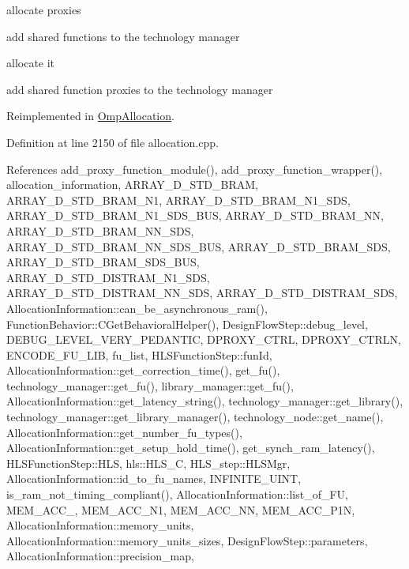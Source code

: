 allocate proxies

add shared functions to the technology manager

allocate it

add shared function proxies to the technology manager 

Reimplemented in \hyperlink{classOmpAllocation_a7be1bcabcbba606451d0abe4e70970f2}{Omp\+Allocation}.



Definition at line 2150 of file allocation.\+cpp.



References add\+\_\+proxy\+\_\+function\+\_\+module(), add\+\_\+proxy\+\_\+function\+\_\+wrapper(), allocation\+\_\+information, A\+R\+R\+A\+Y\+\_\+D\+\_\+\+S\+T\+D\+\_\+\+B\+R\+AM, A\+R\+R\+A\+Y\+\_\+D\+\_\+\+S\+T\+D\+\_\+\+B\+R\+A\+M\+\_\+\+N1, A\+R\+R\+A\+Y\+\_\+D\+\_\+\+S\+T\+D\+\_\+\+B\+R\+A\+M\+\_\+\+N1\+\_\+\+S\+DS, A\+R\+R\+A\+Y\+\_\+D\+\_\+\+S\+T\+D\+\_\+\+B\+R\+A\+M\+\_\+\+N1\+\_\+\+S\+D\+S\+\_\+\+B\+US, A\+R\+R\+A\+Y\+\_\+D\+\_\+\+S\+T\+D\+\_\+\+B\+R\+A\+M\+\_\+\+NN, A\+R\+R\+A\+Y\+\_\+D\+\_\+\+S\+T\+D\+\_\+\+B\+R\+A\+M\+\_\+\+N\+N\+\_\+\+S\+DS, A\+R\+R\+A\+Y\+\_\+D\+\_\+\+S\+T\+D\+\_\+\+B\+R\+A\+M\+\_\+\+N\+N\+\_\+\+S\+D\+S\+\_\+\+B\+US, A\+R\+R\+A\+Y\+\_\+D\+\_\+\+S\+T\+D\+\_\+\+B\+R\+A\+M\+\_\+\+S\+DS, A\+R\+R\+A\+Y\+\_\+D\+\_\+\+S\+T\+D\+\_\+\+B\+R\+A\+M\+\_\+\+S\+D\+S\+\_\+\+B\+US, A\+R\+R\+A\+Y\+\_\+D\+\_\+\+S\+T\+D\+\_\+\+D\+I\+S\+T\+R\+A\+M\+\_\+\+N1\+\_\+\+S\+DS, A\+R\+R\+A\+Y\+\_\+D\+\_\+\+S\+T\+D\+\_\+\+D\+I\+S\+T\+R\+A\+M\+\_\+\+N\+N\+\_\+\+S\+DS, A\+R\+R\+A\+Y\+\_\+D\+\_\+\+S\+T\+D\+\_\+\+D\+I\+S\+T\+R\+A\+M\+\_\+\+S\+DS, Allocation\+Information\+::can\+\_\+be\+\_\+asynchronous\+\_\+ram(), Function\+Behavior\+::\+C\+Get\+Behavioral\+Helper(), Design\+Flow\+Step\+::debug\+\_\+level, D\+E\+B\+U\+G\+\_\+\+L\+E\+V\+E\+L\+\_\+\+V\+E\+R\+Y\+\_\+\+P\+E\+D\+A\+N\+T\+IC, D\+P\+R\+O\+X\+Y\+\_\+\+C\+T\+RL, D\+P\+R\+O\+X\+Y\+\_\+\+C\+T\+R\+LN, E\+N\+C\+O\+D\+E\+\_\+\+F\+U\+\_\+\+L\+IB, fu\+\_\+list, H\+L\+S\+Function\+Step\+::fun\+Id, Allocation\+Information\+::get\+\_\+correction\+\_\+time(), get\+\_\+fu(), technology\+\_\+manager\+::get\+\_\+fu(), library\+\_\+manager\+::get\+\_\+fu(), Allocation\+Information\+::get\+\_\+latency\+\_\+string(), technology\+\_\+manager\+::get\+\_\+library(), technology\+\_\+manager\+::get\+\_\+library\+\_\+manager(), technology\+\_\+node\+::get\+\_\+name(), Allocation\+Information\+::get\+\_\+number\+\_\+fu\+\_\+types(), Allocation\+Information\+::get\+\_\+setup\+\_\+hold\+\_\+time(), get\+\_\+synch\+\_\+ram\+\_\+latency(), H\+L\+S\+Function\+Step\+::\+H\+LS, hls\+::\+H\+L\+S\+\_\+C, H\+L\+S\+\_\+step\+::\+H\+L\+S\+Mgr, Allocation\+Information\+::id\+\_\+to\+\_\+fu\+\_\+names, I\+N\+F\+I\+N\+I\+T\+E\+\_\+\+U\+I\+NT, is\+\_\+ram\+\_\+not\+\_\+timing\+\_\+compliant(), Allocation\+Information\+::list\+\_\+of\+\_\+\+FU, M\+E\+M\+\_\+\+A\+C\+C\+\_, M\+E\+M\+\_\+\+A\+C\+C\+\_\+\+N1, M\+E\+M\+\_\+\+A\+C\+C\+\_\+\+NN, M\+E\+M\+\_\+\+A\+C\+C\+\_\+\+P1N, Allocation\+Information\+::memory\+\_\+units, Allocation\+Information\+::memory\+\_\+units\+\_\+sizes, Design\+Flow\+Step\+::parameters, Allocation\+Information\+::precision\+\_\+map, 
